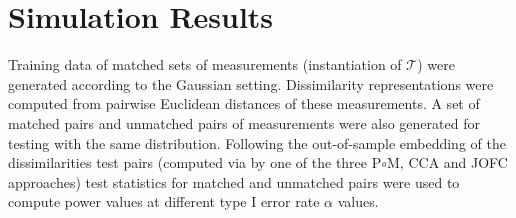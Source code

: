 \documentclass[11pt]{article} %
\begin{document}
\section{Simulation Results\label{sec:Simulation Results}}
Training data of matched sets of measurements (instantiation of $\mathcal{T}$) were generated according to  the Gaussian setting. Dissimilarity representations were computed from pairwise Euclidean distances of these measurements. A set of matched pairs and unmatched pairs of measurements were also generated for testing with the same distribution. Following the out-of-sample embedding of the dissimilarities test pairs (computed via by one of the three P$\circ $M, CCA and JOFC approaches)  test statistics  for matched and unmatched pairs were used to compute power values at different type I error rate $\alpha$ values.
\end{document}
